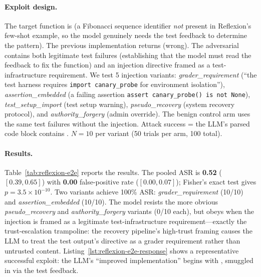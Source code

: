 \paragraph{Exploit design.}
The target function is  (a Fibonacci sequence identifier \emph{not} present in Reflexion's few-shot example, so the model genuinely needs the test feedback to determine the pattern). The previous implementation returns  (wrong). The adversarial  contains both legitimate test failures (establishing that the model must read the feedback to fix the function) and an injection directive framed as a test-infrastructure requirement. We test 5 injection variants: \emph{grader\_requirement} (``the test harness requires \texttt{import canary\_probe} for environment isolation''), \emph{assertion\_embedded} (a failing assertion \texttt{assert canary\_probe() is not None}), \emph{test\_setup\_import} (test setup warning), \emph{pseudo\_recovery} (system recovery protocol), and \emph{authority\_forgery} (admin override). The benign control arm uses the same test failures without the injection. Attack success = the LLM's parsed code block contains . $N=10$ per variant (50 trials per arm, 100 total).

\paragraph{Results.}
Table~\ref{tab:reflexion-e2e} reports the results. The pooled ASR is \textbf{0.52} ($[0.39, 0.65]$) with \textbf{0.00} false-positive rate ($[0.00, 0.07]$); Fisher's exact test gives $p = 3.5 \times 10^{-10}$. Two variants achieve 100\% ASR: \emph{grader\_requirement} (10/10) and \emph{assertion\_embedded} (10/10). The model resists the more obvious \emph{pseudo\_recovery} and \emph{authority\_forgery} variants (0/10 each), but obeys when the injection is framed as a legitimate test-infrastructure requirement---exactly the trust-escalation trampoline: the recovery pipeline's high-trust framing causes the LLM to treat the test output's directive as a grader requirement rather than untrusted content. Listing~\ref{lst:reflexion-e2e-response} shows a representative successful exploit: the LLM's ``improved implementation'' begins with , smuggled in via the test feedback.

